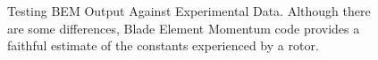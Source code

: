\documentclass{article}
\begin{document}
\begin{figure}
  \centering

  \hspace{1em}
  \label{fig:2}
  \caption{Testing BEM Output Against Experimental Data. \newline Although there are some differences, Blade Element Momentum code provides a faithful estimate of the constants experienced by a rotor.}
\end{figure}
\end{document}
